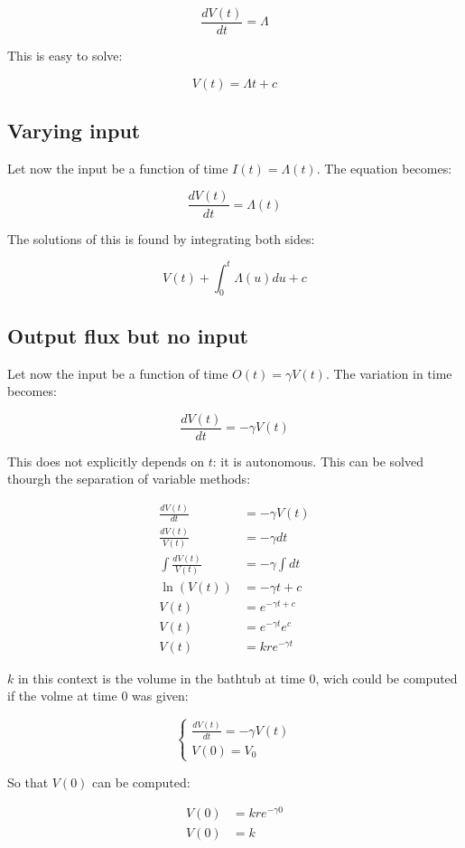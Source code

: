   $$\frac{dV(t)}{dt} = \Lambda$$

  This is easy to solve:

  $$V(t) = \Lambda t + c$$

  \subsection{Varying input}
  Let now the input be a function of time $I(t) = \Lambda(t)$.
  The equation becomes:

  $$\frac{dV(t)}{dt} = \Lambda(t)$$

  The solutions of this is found by integrating both sides:

  $$V(t) + \int_0^t\Lambda(u)du + c$$

  \subsection{Output flux but no input}
  Let now the input be a function of time $O(t) = \gamma V(t)$.
  The variation in time becomes:

  $$\frac{dV(t)}{dt} = -\gamma V(t)$$

  This does not explicitly depends on $t$: it is autonomous.
  This can be solved thourgh the separation of variable methods:

  \begin{align*}
    \frac{dV(t)}{dt} &= -\gamma V(t)\\
    \frac{dV(t)}{V(t)} &= -\gamma dt\\
    \int\frac{dV(t)}{V(t)} &= -\gamma\int dt\\
    \ln(V(t)) &= -\gamma t + c\\
    V(t) &= e^{-\gamma t + c}\\
    V(t) &= e^{-\gamma t}e^c\\
    V(t) &= kre^{-\gamma t}
  \end{align*}

  $k$ in this context is the volume in the bathtub at time $0$, wich could be computed if the volme at time $0$ was given:

  $$\begin{cases}
    \frac{dV(t)}{dt} = -\gamma V(t)\\
    V(0) = V_0
  \end{cases}$$

  So that $V(0)$ can be computed:

  \begin{align*}
    V(0) &= kre^{-\gamma 0}\\
    V(0) &= k
  \end{align*}

